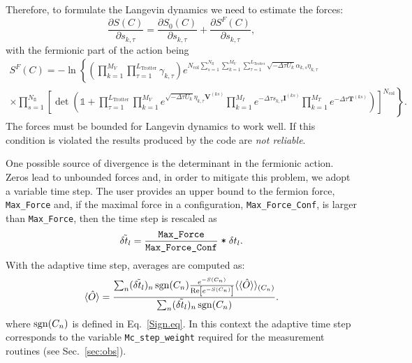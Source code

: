 Therefore, to  formulate  the Langevin dynamics  we need  to estimate the forces:
\begin{equation}
	\frac { \partial S (C)}{\partial s_{k,\tau} } =\frac { \partial S_{0}(C)}{\partial s_{k,\tau} } +  \frac { \partial S^F(C)}{\partial s_{k,\tau} },
\end{equation}
with the fermionic part of the action being
\begin{multline}
S^F(C) =   - \ln \left\{  \left( \prod_{k=1}^{M_V} \prod_{\tau=1}^{L_{\mathrm{Trotter}}} \gamma_{k,\tau} \right)
    e^{ N_{\mathrm{col}}\sum\limits_{s=1}^{N_{\mathrm{fl}}} \sum\limits_{k=1}^{M_V} \sum\limits_{\tau = 1}^{L_{\mathrm{Trotter}}}\sqrt{-\Delta \tau U_k}  \alpha_{k,s} \eta_{k,\tau} } 
  \right.  \\
    \left. \times
	\prod_{s=1}^{N_{\mathrm{fl}}}\left[\det\left(  \mathds{1} + 
	\prod_{\tau=1}^{L_{\mathrm{Trotter}}}   
	\prod_{k=1}^{M_V}   e^{  \sqrt{ -\Delta \tau  U_k} \eta_{k,\tau} {\bm V}^{(ks)} }   \prod_{k=1}^{M_I}   e^{  -\Delta \tau s_{k,\tau}  {\bm I}^{(ks)}}  
	\prod_{k=1}^{M_T}   e^{-\Delta \tau {\bm T}^{(ks)}} 
	\right) \right]^{N_{\mathrm{col}}} \right\}  .
\end{multline}
The forces must be bounded for Langevin dynamics to work well. If this condition is violated the results produced by the code are \emph{not reliable}. 

One possible source of divergence is the determinant in the fermionic action. Zeros lead to unbounded forces and, in order to mitigate this problem, we adopt a variable time step.  The user provides an upper bound to the fermion force, \texttt{Max\_Force} and, if the maximal force in a configuration, \texttt{Max\_Force\_Conf}, is larger than \texttt{Max\_Force}, then the time step is rescaled as 
\begin{equation}
     \tilde{\delta t_{l}}   =  \frac{ \texttt{Max\_Force}} {\texttt{Max\_Force\_Conf}} \; \texttt{*} \; \delta t_{l}.
\end{equation}
With the adaptive time  step,  averages are computed as: 
\begin{equation} \label{eq:obs_varstep}
   \langle \hat{O} \rangle = \frac{ \sum_n (  \tilde{\delta t_{l}}  )_n  \operatorname{sgn}(C_n)   \frac{e^{-S(C_n)}}{\operatorname{Re} \left[e^{-S(C_n)} \right]}   \langle \langle \hat{O} \rangle   \rangle_{(C_n)} } {\sum_n (  \tilde{\delta t_{l}}  )_n  \operatorname{sgn}(C_n)  }. 
\end{equation}
where  $\operatorname{sgn}(C_n)$   is defined in Eq.~\eqref{Sign.eq}.    In this context the adaptive time step corresponds to the variable \texttt{Mc\_step\_weight}  required for the measurement routines (see Sec.~\ref{sec:obs}).  {\color{red}{FFA. We will have to update this section}}

